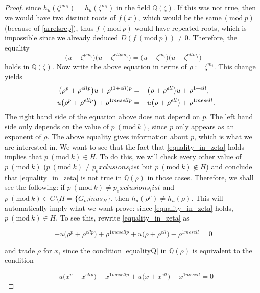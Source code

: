 \documentclass[a4paper, 12pt]{article}
\theoremstyle{definition}
\theoremstyle{remark}
\newcommand{\Q}{\ensuremath{\mathbb{Q}}}
\newcommand{\Mod}[1]{\ (\mathrm{mod}\ #1)} %
\begin{document}
\begin{proof}
since $h_{{u}}(\zeta^{pm_i})=h_{{u}}(\zeta^{m_i})$ in the field $\Q(\zeta)$. If this was not true, then we would have two distinct roots of $f(x)$, which would be the same$\Mod{p}$ (because of \eqref{arrelsrep}), thus $f \Mod{p}$ would have repeated roots, which is impossible since we already deduced $D(f \Mod{p})\neq 0$. Therefore, the equality
\begin{equation*}
\big({{u}}-\zeta^{pm_i}\big)\big({{u}}-\zeta^{{ell}pm_i}\big)=\big({{u}}-\zeta^{m_i}\big)\big({{u}}-\zeta^{{ell}m_i}\big)
\end{equation*}
holds in $\Q(\zeta)$. Now write the above equation in terms of $\rho:=\zeta^{m_i}$. This change yields
\begin{align}
-\big(\rho^{p}+\rho^{{ell}p}\big){{u}}+\rho^{(1+{ell})p}&=-\big(\rho+\rho^{{ell}}\big){{u}}+\rho^{1+{ell}},\notag \\
-{u}\big(\rho^{p}+\rho^{{ell}p}\big)+\rho^{{1mesell}p}&=-{u}\big(\rho+\rho^{{ell}}\big)+\rho^{{1mesell}}\label{equality_in_zeta}.
\end{align}
The right hand side of the equation above does not depend on $p$. The left hand side only depends on the value of $p\Mod{{k}}$, since $p$ only appears as an exponent of $\rho$. The above equality gives information about $p$, which is what we are interested in. We want to see that the fact that \eqref{equality_in_zeta} holds implies that $p \Mod{{k}}\in H$. To do this, we will check every other value of $p \Mod{{k}}$ ($p \Mod{{k}}\neq{p_exclusions_list}$ but $p \Mod{{k}}\notin H$) and conclude that \eqref{equality_in_zeta} is not true in $\Q(\rho)$ in those cases. Therefore, we shall see the following: if $p \Mod{{k}}\neq{p_exclusions_list}$ and $p \Mod{{k}}\in G\setminus H=\{{G_minus_H}\}$, then $h_{{u}}(\rho^p)\neq h_{{u}}(\rho)$. This will automatically imply what we want prove: since \eqref{equality_in_zeta} holds, $p \Mod{{k}}\in H$. To see this, rewrite \eqref{equality_in_zeta} as

\begin{equation}\label{equalityQ}
-{u}\big(\rho^{p}+\rho^{{ell}p}\big)+\rho^{{1mesell}p}+{u}\big(\rho+\rho^{{ell}}\big)-\rho^{{1mesell}}=0
\end{equation}

and trade $\rho$ for $x$, since the condition \eqref{equalityQ} in $\Q(\rho)$ is equivalent to the condition

\begin{equation}\label{polycheck0}
-{u}\big(x^p+x^{{ell}p}\big)+x^{{1mesell}p}+{u}\big(x+x^{{ell}}\big)-x^{{1mesell}}=0
\end{equation}


\end{proof}
\end{document}
